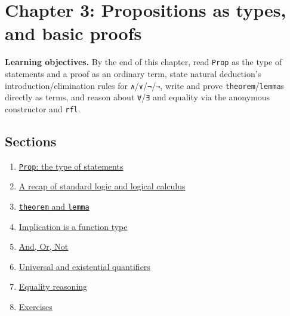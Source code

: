 \chapter{Chapter 3: Propositions as types, and basic proofs}\label{sec:03-propositions-and-proofs:00-index:1}

\textbf{Learning objectives.} By the end of this chapter, read \texttt{Prop} as the type of statements and a proof as an ordinary term, state natural deduction's introduction/elimination rules for \texttt{∧}/\texttt{∨}/\texttt{¬}/\texttt{→}, write and prove \texttt{theorem}/\texttt{lemma}s directly as terms, and reason about \texttt{∀}/\texttt{∃} and equality via the anonymous constructor and \texttt{rfl}.

\section{Sections}\label{sec:03-propositions-and-proofs:00-index:2}

\begin{enumerate}
\def\labelenumi{\arabic{enumi}.}
\tightlist
\item
  \hyperref[sec:03-propositions-and-proofs:01-prop:1]{\texttt{Prop}: the type of statements}
\item
  \hyperref[sec:03-propositions-and-proofs:02-logic-recap:1]{A recap of standard logic and logical calculus}
\item
  \hyperref[sec:03-propositions-and-proofs:03-theorem-lemma:1]{\texttt{theorem} and \texttt{lemma}}
\item
  \hyperref[sec:03-propositions-and-proofs:04-implication:1]{Implication is a function type}
\item
  \hyperref[sec:03-propositions-and-proofs:05-and-or-not:1]{And, Or, Not}
\item
  \hyperref[sec:03-propositions-and-proofs:06-quantifiers:1]{Universal and existential quantifiers}
\item
  \hyperref[sec:03-propositions-and-proofs:07-equality:1]{Equality reasoning}
\item
  \hyperref[sec:03-propositions-and-proofs:08-exercises:1]{Exercises}
\end{enumerate}









